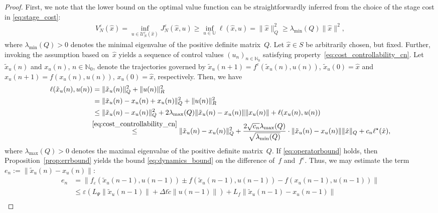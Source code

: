 \documentclass{article}
\numberwithin{equation}{section}
\begin{document}
	\begin{proof}
		First, we note that the lower bound on the optimal value function can be straightforwardly inferred from the choice of the stage cost in \eqref{eq:stage_cost}:
		\begin{align*}
		V_N^\varepsilon(\hat{x}) = \inf_{u\in \mathcal{U}_N^\varepsilon(\hat{x})} J_N^\varepsilon(\hat{x},u) \geq \inf_{u\in \mathbb{U}}\ell(\hat{x},u) = \| \hat{x} \|_Q^2 \geq \lambda_{\min}(Q) \| \hat{x} \|^2,
		\end{align*}
		where $\lambda_{\min}(Q) > 0$ denotes the minimal eigenvalue of the positive definite matrix~$Q$.
		Let $\hat{x} \in S$ be arbitrarily chosen, but fixed. Further, invoking the assumption based on~$\hat{x}$ yields a sequence of control values $(u_n)_{n \in \mathbb{N}_0}$ satisfying property~\eqref{eq:cost_controllability_cn}. Let $\tilde{x}_u(n)$ and ${x}_u(n)$, $n \in \mathbb{N}_0$, denote the trajectories governed by $\tilde{x}_u(n+1) = f^\varepsilon(\tilde{x}_u(n),u(n))$, $\tilde{x}_u(0) = \hat{x}$ and $x_u(n+1) = f({x}_u(n),u(n))$, ${x}_u(0) = \hat{x}$, respectively.
		Then, we have
		\begin{align*}
		\ell(\tilde{x}_u(n), u(n)) & = \| \tilde{x}_u(n) \|^2_Q + \| u(n) \|^2_R \\
		& = \| \tilde{x}_u(n) - x_u(n) + x_u(n) \|^2_Q + \| u(n) \|^2_R \\
		& \leq \| \tilde{x}_u(n) - x_u(n) \|^2_Q + 2 \lambda_{\max}(Q) \| \tilde{x}_u(n) - x_u(n) \| \| x_u(n) \| + \ell(x_u(n),u(n)) \\
		& \!\!\stackrel{\eqref{eq:cost_controllability_cn}}{\leq} \| \tilde{x}_u(n) - x_u(n) \|^2_Q + \frac {2\sqrt{c_n} \lambda_{\max}(Q)}{\sqrt{\lambda_{\min}(Q)}} \cdot \| \tilde{x}_u(n) - x_u(n) \| \| \hat{x} \|_Q + c_n \ell^\star(\hat{x}),
		\end{align*}    
		where $\lambda_{\max}(Q) > 0$ denotes the maximal eigenvalue of the positive definite matrix~$Q$.
		If \eqref{eq:operatorbound} holds, then Proposition~\ref{prop:errbound} yields the bound \eqref{eq:dynamics_bound} on the difference of~$f$ and~$f^\varepsilon$. Thus, we may estimate the term $e_n := \| \tilde{x}_u(n) - x_u(n) \|$:
		\begin{align*}
		e_n & = \| f_\varepsilon(\tilde{x}_u(n-1),u(n-1)) \pm f(\tilde{x}_u(n-1),u(n-1)) - f(x_u(n-1),u(n-1)) \| \\
		& \leq \varepsilon \left( L_\Psi \| \tilde{x}_u(n-1) \| + \Delta t \tilde{c} \| u(n-1) \| \right)  + L_f \| \tilde{x}_u(n-1) - x_u(n-1) \| \\

\end{align*}
\end{proof}
\end{document}

